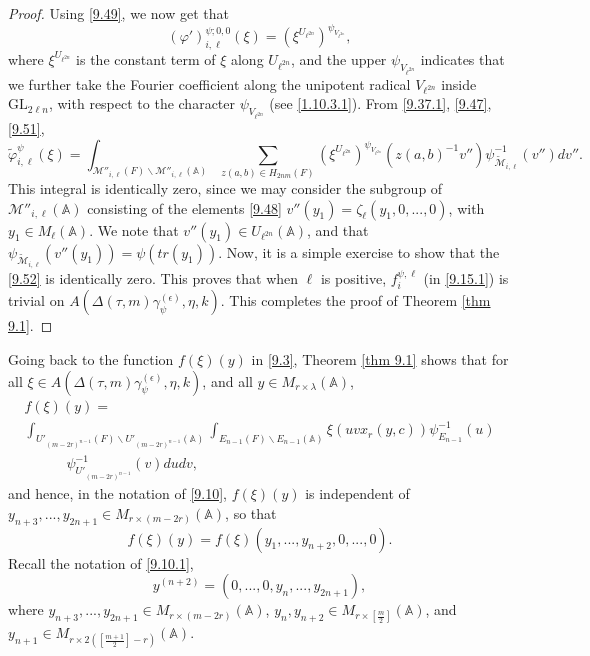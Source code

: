 \documentclass[12pts]{amsart}
\newcommand{\BA}{{\mathbb {A}}}
\newcommand{\GL}{{\mathrm{GL}}}
\begin{document}
\begin{proof}
Using \eqref{9.49}, we now get that
\begin{equation}\label{9.51}
(\varphi')_{i,\ell}^{\psi;0,0}(\xi)=(\xi^{U_{\ell^{2n}}})^{\psi_{V_{\ell^{2n}}}},
\end{equation}
where $\xi^{U_{\ell^{2n}}}$ is the constant term of $\xi$ along $U_{\ell^{2n}}$, and the upper $\psi_{V_{\ell^{2n}}}$ indicates that we further take the Fourier coefficient along the unipotent radical $V_{\ell^{2n}}$ inside $\GL_{2\ell n}$, with respect to the character $\psi_{V_{\ell^{2n}}}$ (see \eqref{1.10.3.1}). From \eqref{9.37.1}, \eqref{9.47}, \eqref{9.51},
\begin{equation}\label{9.52}
\tilde{\varphi}_{i,\ell}^\psi(\xi)=
\int_{\mathcal{M}''_{i,\ell}(F)\backslash
	\mathcal{M}''_{i,\ell}(\BA)}\sum_{z(a,b)\in H_{2nm}(F)}(\xi^{U_{\ell^{2n}}})^{\psi_{V_{\ell^{2n}}}}(z(a,b)^{-1}v'')
\psi^{-1}_{\tilde{\mathcal{M}}_{i,\ell}}(v'')dv''.
\end{equation}
This integral is identically zero, since we may consider the subgroup of $	\mathcal{M}''_{i,\ell}(\BA)$ consisting of the elements \eqref{9.48} $v''(y_1)=\zeta_\ell(y_1,0,...,0)$, with $y_1\in M_\ell(\BA)$. We note that $v''(y_1)\in U_{\ell^{2n}}(\BA)$, and that $\psi_{\tilde{\mathcal{M}}_{i,\ell}}(v''(y_1))=\psi(tr(y_1))$. Now, it is a simple exercise to show that the \eqref{9.52} is identically zero. This proves that when $\ell$ is positive, $f_i^{\psi,\ell}$ (in \eqref{9.15.1}) is trivial on $A(\Delta(\tau,m)\gamma_\psi^{(\epsilon)},\eta,k)$. This completes the proof of Theorem \ref{thm 9.1}. 
 	 
\end{proof}

Going back to the function $f(\xi)(y)$ in \eqref{9.3}, Theorem \ref{thm 9.1} shows that for all $\xi\in A(\Delta(\tau,m)\gamma_\psi^{(\epsilon)},\eta,k)$, and all $y\in M_{r\times \lambda}(\BA)$,
\begin{multline}\label{9.54}
f(\xi)(y)=\\
\int_{U'_{{(m-2r)}^{n-1}}(F)\backslash
	U'_{{(m-2r)}^{n-1}}(\BA)}\int_{E_{n-1}(F)\backslash E_{n-1}(\BA)}\xi(uvx_r(y,c))\psi^{-1}_{E_{n-1}}(u)\\
\quad\quad\quad\psi^{-1}_{U'_{{(m-2r)}^{n-1}}}(v)dudv,
\end{multline}
and hence, in the notation of \eqref{9.10}, $f(\xi)(y)$ is independent of $y_{n+3},...,y_{2n+1}\in M_{r\times(m-2r)}(\BA)$, so that
\begin{equation}\label{9.54.1}
f(\xi)(y)=f(\xi)(y_1,...,y_{n+2},0,...,0).
\end{equation}
Recall the notation of \eqref{9.10.1}, 
\begin{equation}\label{9.55}
y^{(n+2)}=(0,...,0, y_n,...,y_{2n+1}),
\end{equation}
where $y_{n+3},...,y_{2n+1}\in M_{r\times(m-2r)}(\BA)$, $y_n,y_{n+2}\in M_{r\times [\frac{m}{2}]}(\BA)$, and\\
 $y_{n+1}\in M_{r\times 2([\frac{m+1}{2}]-r)}(\BA)$. 
\end{document}
